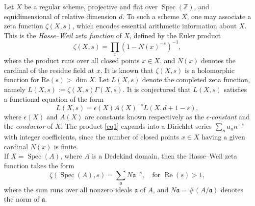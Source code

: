 \documentclass[12pt]{amsart}
\begin{document}
 Let $X$ be a regular scheme, projective and flat over $\operatorname{Spec}(\mathbb{Z})$, and equidimensional of relative dimension $d$. To such a scheme $X$, one may associate a zeta function $\zeta(X, s)$, which encodes essential  {arithmetic}  information about $X$. This is the \emph{Hasse--Weil zeta function} of $X$, defined by the Euler product
\begin{equation}\label{eq1}
\zeta(X, s) = \prod_{x} \left(1 - N(x)^{-s}\right)^{-1},
\end{equation}
where the product runs over all closed points $x \in X$, and $N(x)$ denotes the cardinal of the residue field at $x$.  It is known that $\zeta(X,s)$ is a holomorphic function for $\mathrm{Re}(s)>\dim X$. Let $L(X, s)$ denote the completed zeta function, namely $
L(X, s) := \zeta(X, s)  \Gamma(X, s).
$
It is conjectured that $L(X, s)$ satisfies a functional equation of the form
\[
L(X, s) = \epsilon(X)  A(X)^{-s}  L(X, d+1-s),
\]
where $\epsilon(X)$ and $A(X) $ are constants
 known respectively as the \emph{$\epsilon$-constant} and the \emph{conductor} of $X$. The product \eqref{eq1} expands into a Dirichlet series $\sum_n a_n n^{-s}$ with integer coefficients, since the number of closed points $x  \in X$ having a given cardinal  $N(x)$ is finite.\\





If $X = \operatorname{Spec}(A)$, where $A$ is a Dedekind domain, then the Hasse--Weil zeta function takes the form
\begin{equation}
\zeta(\operatorname{Spec}(A), s) = \sum_{\mathfrak{a}} N\mathfrak{a}^{-s}, \quad \text{for } \operatorname{Re}(s) > 1,
\end{equation}
where the sum runs over all nonzero ideals $\mathfrak{a}$ of $A$, and $N\mathfrak{a} = \#(A/\mathfrak{a})$ denotes the norm of $\mathfrak{a}$.  
\end{document}
